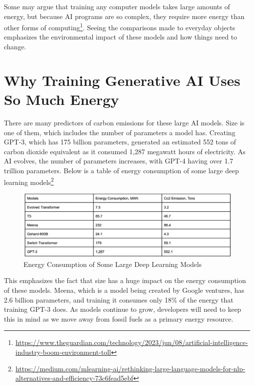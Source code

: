\documentclass[
]{book}
\begin{document}
Some may argue that training any computer models takes large amounts of energy, but because AI programs are so complex, they require more energy than other forms of computing\footnote{\url{https://www.theguardian.com/technology/2023/jun/08/artificial-intelligence-industry-boom-environment-toll}}. Seeing the comparisons made to everyday objects emphasizes the environmental impact of these models and how things need to change.

\hypertarget{why-training-generative-ai-uses-so-much-energy}{%
\section{Why Training Generative AI Uses So Much Energy}\label{why-training-generative-ai-uses-so-much-energy}}

There are many predictors of carbon emissions for these large AI models. Size is one of them, which includes the number of parameters a model has. Creating GPT-3, which has 175 billion parameters, generated an estimated 552 tons of carbon dioxide equivalent as it consumed 1,287 megawatt hours of electricity. As AI evolves, the number of parameters increases, with GPT-4 having over 1.7 trillion parameters. Below is a table of energy consumption of some large deep learning models\footnote{\url{https://medium.com/mlearning-ai/rethinking-large-language-models-for-nlp-alternatives-and-efficiency-73c6fead5ebf}}

\begin{figure}
\centering
\includegraphics{figures/figure4.png}
\caption{Energy Consumption of Some Large Deep Learning Models}
\end{figure}

This emphasizes the fact that size has a huge impact on the energy consumption of these models. Meena, which is a model being created by Google ventures, has 2.6 billion parameters, and training it consumes only 18\% of the energy that training GPT-3 does. As models continue to grow, developers will need to keep this in mind as we move away from fossil fuels as a primary energy resource.
\end{document}
